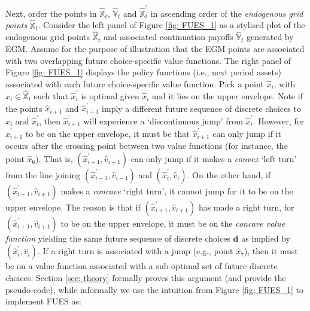 \documentclass[12pt]{article}
\begin{document}
Next, order the points in $\hat{\mathbb{X}}_{t}$, $\hat{\mathbb{V}}_{t}$ and $\hat{\mathbb{X}}_{t}^{\prime}$ in ascending order of the \textit{endogenous grid points} $\hat{\mathbb{X}}_{t}$. Consider the left panel of Figure \ref{fig: FUES_1} as a stylised plot of the endogenous grid points $\hat{\mathbb{X}}_{t}$ and associated continuation payoffs $\hat{\mathbb{V}}_{t}$ generated by EGM. Assume for the purpose of illustration that the EGM points are associated with two overlapping future choice-specific value functions. The right panel of Figure \ref{fig: FUES_1} displays the policy functions (i.e., next period assets) associated with each future choice-specific value function. Pick a point $\hat{x}_{i}$, with $\hat{x}_{i}\in \hat{\mathbb{X}}_{t}$ such that $\hat{x}_{i}^{\prime}$ is optimal given $\hat{x}_{i}$ and it lies on the upper envelope.  Note if the points $\hat{x}_{i+1}$ and  $\hat{x}_{i+1}^{\prime}$ imply a different future sequence of discrete choices to $\hat{x}_{i}$ and $\hat{x}_{i}^{\prime}$, then $\hat{x}_{i+1}^{\prime}$ will experience a `discontinuous jump' from $\hat{x}_{i}^{\prime}$. However, for $\hat{x}_{i+1}^{\prime}$ to be on the upper envelope, it must be that $\hat{x}_{i+1}^{\prime}$ can only jump if it occurs after the crossing point between two value functions (for instance, the point $\hat{x}_{6}$). That is, $(\hat{x}_{i+1}^{\prime}, \hat{v}_{i+1})$ can only jump if it makes a \textit{convex} `left turn' from the line joining $(\hat{x}_{i-1}^{\prime}, \hat{v}_{i-1})$ and $(\hat{x}_{i}^{\prime}, \hat{v}_{i})$. On the other hand, if $(\hat{x}_{i+1}^{\prime}, \hat{v}_{i+1})$ makes a \textit{concave} `right turn', it cannot jump for it to be on the upper envelope. The reason is that if $(\hat{x}_{i+1}^{\prime}, \hat{v}_{i+1})$ has made a right turn, for $(\hat{x}_{i+1}^{\prime}, \hat{v}_{i+1})$ to be on the upper envelope, it must be on the \textit{concave value function} yielding the same future sequence of discrete choices $\textbf{d}$ as implied by $(\hat{x}_{i}^{\prime}, \hat{v}_{i})$. If a right turn is associated with a jump (e.g., point $\hat{x}_{7}$), then it must be on a value function associated with a sub-optimal set of future discrete choices. Section \ref{sec: theory} formally proves this argument (and provide the pseudo-code), while informally we use the intuition from Figure \ref{fig: FUES_1} to implement FUES as:
%
\end{document}
